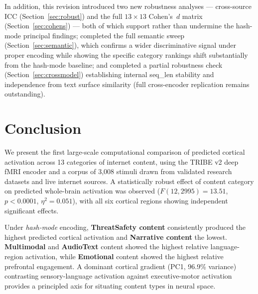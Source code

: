 \documentclass[11pt,letterpaper]{article}
\begin{document}
In addition, this revision introduced two new robustness analyses --- cross-source ICC (Section~\ref{sec:robust}) and the full $13\times13$ Cohen's~$d$ matrix (Section~\ref{sec:cohens}) --- both of which support rather than undermine the hash-mode principal findings; completed the full semantic sweep (Section~\ref{sec:semantic}), which confirms a wider discriminative signal under proper encoding while showing the specific category rankings shift substantially from the hash-mode baseline; and completed a partial robustness check (Section~\ref{sec:crossmodel}) establishing internal seq\_len stability and independence from text surface similarity (full cross-encoder replication remains outstanding).

\FloatBarrier
\clearpage
\section{Conclusion}

We present the first large-scale computational comparison of predicted cortical activation across 13 categories of internet content, using the TRIBE v2 deep fMRI encoder and a corpus of 3{,}008 stimuli drawn from validated research datasets and live internet sources. A statistically robust effect of content category on predicted whole-brain activation was observed ($F(12, 2995) = 13.51$, $p < 0.0001$, $\eta^2 = 0.051$), with all six cortical regions showing independent significant effects.

Under \emph{hash-mode} encoding, \textbf{ThreatSafety content} consistently produced the highest predicted cortical activation and \textbf{Narrative content} the lowest. \textbf{Multimodal} and \textbf{AudioText} content showed the highest relative language-region activation, while \textbf{Emotional} content showed the highest relative prefrontal engagement. A dominant cortical gradient (PC1, 96.9\% variance) contrasting sensory-language activation against executive-motor activation provides a principled axis for situating content types in neural space.
\end{document}
